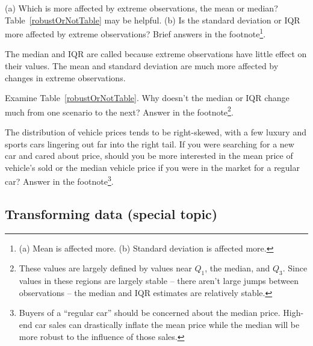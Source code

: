 \begin{exercise}
(a) Which is more affected by extreme observations, the mean or median? Table~\ref{robustOrNotTable} may be helpful. (b) Is the standard deviation or IQR more affected by extreme observations? Brief answers in the footnote\footnote{(a) Mean is affected more. (b) Standard deviation is affected more.}.
\end{exercise}

The median and IQR are called  because extreme observations have little effect on their values. The mean and standard deviation are much more affected by changes in extreme observations.

\begin{exercise}
Examine Table~\ref{robustOrNotTable}. Why doesn't the median or IQR change much from one scenario to the next? Answer in the footnote\footnote{These values are largely defined by values near $Q_1$, the median, and $Q_3$. Since values in these regions are largely stable -- there aren't large jumps between observations -- the median and IQR estimates are relatively stable.}.
\end{exercise}

\begin{exercise}
The distribution of vehicle prices tends to be right-skewed, with a few luxury and sports cars lingering out far into the right tail. If you were searching for a new car and cared about price, should you be more interested in the mean price of vehicle's sold or the median vehicle price if you were in the market for a regular car? Answer in the footnote\footnote{Buyers of a ``regular car'' should be concerned about the median price. High-end car sales can drastically inflate the mean price while the median will be more robust to the influence of those sales.}.
\end{exercise}

\subsection{Transforming data (special topic)}

